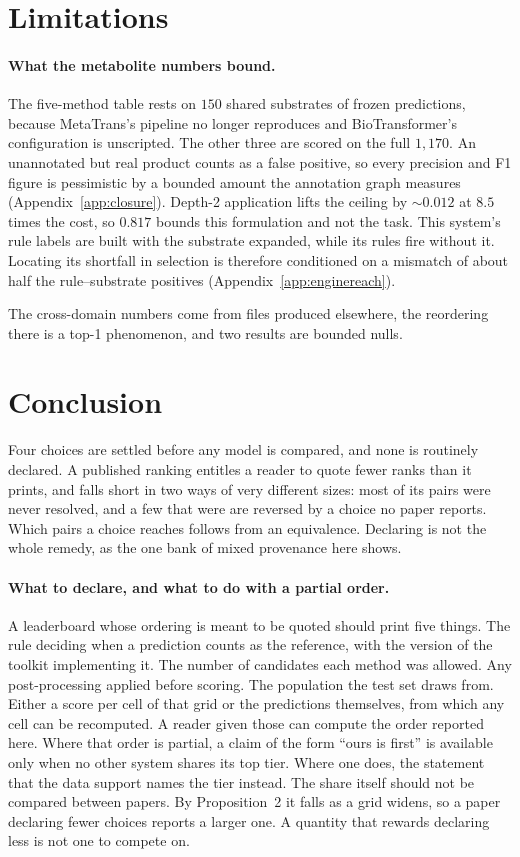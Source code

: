 \documentclass{article}
\newcommand{\ntest}{1{,}170}          %
\newcommand{\nshared}{150}            %
\newcommand{\ceiling}{0.817}          %
\begin{document}
\section{Limitations}
\label{sec:limitations}

\paragraph{What the metabolite numbers bound.} The five-method table rests on $\nshared$ shared
substrates of frozen predictions, because MetaTrans's pipeline no longer reproduces and
BioTransformer's configuration is unscripted. The other three are scored on the full
$\ntest$. An unannotated but real product counts as a false positive, so every precision and F1
figure is pessimistic by a bounded amount the annotation graph measures
(Appendix~\ref{app:closure}). Depth-2 application lifts the ceiling by ${\sim}0.012$ at $8.5$ times
the cost, so $\ceiling$ bounds this formulation and not the task. This system's rule labels are
built with the substrate expanded, while its rules fire without it. Locating its shortfall in
selection is therefore conditioned on a mismatch of about half the rule--substrate positives
(Appendix~\ref{app:enginereach}).

The cross-domain numbers come from files produced elsewhere, the reordering there is a top-1
phenomenon, and two results are bounded nulls.
\section{Conclusion}
\label{sec:conclusion}

Four choices are settled before any model is compared, and none is routinely declared. A published
ranking entitles a reader to quote fewer ranks than it prints, and falls short in two ways of very
different sizes: most of its pairs were never resolved, and a few that were are reversed by a choice
no paper reports. Which pairs a choice reaches follows from an equivalence. Declaring is not the
whole remedy, as the one bank of mixed provenance here shows.

\paragraph{What to declare, and what to do with a partial order.} A leaderboard whose ordering is
meant to be quoted should print five things. The rule deciding when a prediction counts as the
reference, with the version of the toolkit implementing it. The number of candidates each method was
allowed. Any post-processing applied before scoring. The population the test set draws from. Either
a score per cell of that grid or the predictions themselves, from which any cell can be recomputed.
A reader given those can compute the order reported here. Where that order is partial, a claim of
the form ``ours is first'' is available only when no other system shares its top tier. Where one
does, the statement that the data support names the tier instead. The share itself should not be
compared between papers. By Proposition~2 it falls as a grid widens, so a paper declaring fewer
choices reports a larger one. A quantity that rewards declaring less is not one to compete on.
\end{document}
